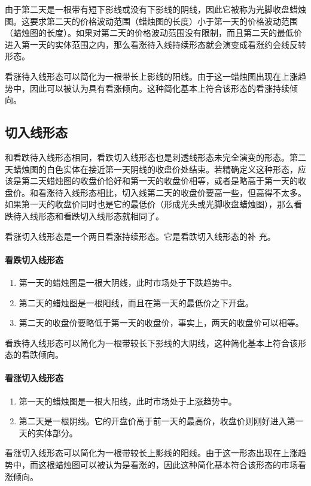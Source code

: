由于第二天是一根带有短下影线或没有下影线的阴线，因此它被称为光脚收盘蜡烛图。这要求第二天的价格波动范围（蜡烛图的长度）小于第一天的价格波动范围（蜡烛图的长度）。如果对第二天的价格波动范围没有限制，而且第二天的最低价进入第一天的实体范围之内，那么看涨待入线持续形态就会演变成看涨约会线反转形态。

看涨待入线形态可以简化为一根带长上影线的阳线。由于这一蜡烛图出现在上涨趋势中，因此可以被认为具有看涨倾向。这种简化基本上符合该形态的看涨持续倾向。
\subsection{切入线形态}
和看跌待入线形态相同，看跌切入线形态也是刺透线形态未完全演变的形态。第二天蜡烛图的白色实体在接近第一天阴线的收盘价处结束。若精确定义这种形态，应该是第二天蜡烛图的收盘价恰好和第一天的收盘价相等，或者是略高于第一天的收盘价。和看涨待入线形态相比，切入线第二天的收盘价要高一些，但高得不太多。如果第一天的收盘价同时也是它的最低价（形成光头或光脚收盘蜡烛图），那么看跌待入线形态和看跌切入线形态就相同了。

看涨切入线形态是一个两日看涨持续形态。它是看跌切入线形态的补
充。

\paragraph{看跌切入线形态}
\begin{enumerate}
    \item 第一天的蜡烛图是一根大阴线，此时市场处于下跌趋势中。
    \item 第二天的蜡烛图是一根阳线，而且在第一天的最低价之下开盘。
    \item 第二天的收盘价要略低于第一天的收盘价，事实上，两天的收盘价可以相等。
\end{enumerate}

看跌待入线形态可以简化为一根带较长下影线的大阴线，这种简化基本上符合该形态的看跌倾向。

\paragraph{看涨切入线形态}
\begin{enumerate}
    \item 第一天的蜡烛图是一根大阳线，此时市场处于上涨趋势中。
    \item 第二天是一根阴线。它的开盘价高于前一天的最高价，收盘价则刚好进入第一天的实体部分。
\end{enumerate}

看涨切入线形态可以简化为一根带较长上影线的阳线。由于这一形态出现在上涨趋势中，而这根蜡烛图可以被认为是看涨的，因此这种简化基本符合该形态的市场看涨倾向。


